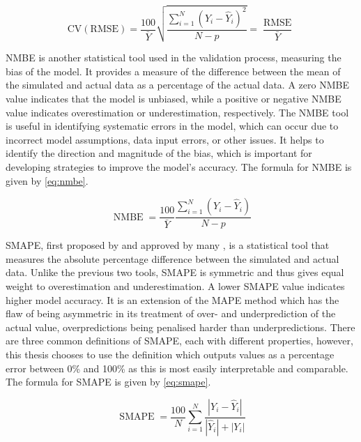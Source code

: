 \begin{equation}
    \operatorname{CV(RMSE)} = \frac{100}{\bar{Y}} \sqrt{\frac{\sum_{i=1}^N(Y_i - \hat{Y}_i)^2}{N-p}} = \frac{\operatorname{RMSE}}{\bar{Y}}  \label{eq:cvrmse}
\end{equation}

\ac{NMBE} is another statistical tool used in the validation process, measuring the bias of the model. It provides a measure of the difference between the mean of the simulated and actual data as a percentage of the actual data. A zero \ac{NMBE} value indicates that the model is unbiased, while a positive or negative \ac{NMBE} value indicates overestimation or underestimation, respectively. The  \ac{NMBE} tool is useful in identifying systematic errors in the model, which can occur due to incorrect model assumptions, data input errors, or other issues. It helps to identify the direction and magnitude of the bias, which is important for developing strategies to improve the model's accuracy. The formula for \ac{NMBE} is given by \cref{eq:nmbe}.

\begin{equation}
    \operatorname{NMBE} = \frac{100}{\bar{Y}} \frac{\sum_{i=1}^N(Y_i - \hat{Y}_i)}{N-p} \label{eq:nmbe}
\end{equation}

\ac{SMAPE}, first proposed by \citeauthor{MAKRIDAKIS1993527} \cite{MAKRIDAKIS1993527} and approved by many \cite{tofallis_better_2015,khendek_system_2018,kim_new_2016}, is a statistical tool that measures the absolute percentage difference between the simulated and actual data. Unlike the previous two tools, \ac{SMAPE} is symmetric and thus gives equal weight to overestimation and underestimation. A lower \ac{SMAPE} value indicates higher model accuracy. It is an extension of the MAPE method which has the flaw of being asymmetric in its treatment of over- and underprediction of the actual value, overpredictions being penalised harder than underpredictions. There are three common definitions of \ac{SMAPE}, each with different properties, however, this thesis chooses to use the definition which outputs values as a percentage error between 0\% and 100\% as this is most easily interpretable and comparable. The formula for \ac{SMAPE} is given by \cref{eq:smape}.

\begin{equation}
    \operatorname{SMAPE} = \frac{100}{N} \sum_{i=1}^N\frac{|Y_i - \hat{Y}_i|}{|\hat{Y}_i|+|Y_i|} \label{eq:smape}
\end{equation}


